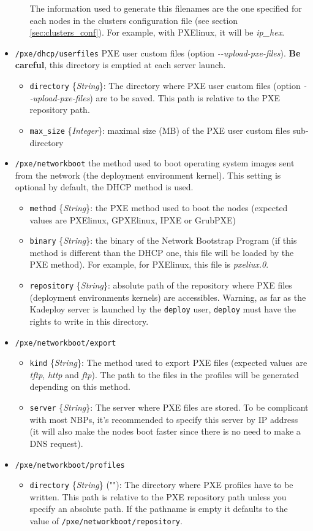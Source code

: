 \documentclass[a4wide,10pt,oneside]{book}
\newcommand{\ypath}[1]{\texttt{#1}}
\newcommand{\yfield}[2]{\texttt{#1} {\small\{{\emph{#2}}\}}:}
\newcommand{\yfieldd}[3]{\texttt{#1} {\small\{{\emph{#2}}\}} {\small(}#3{\small)}:}
\begin{document}
\begin{itemize}
\begin{itemize}
The information used to generate this filenames are the one specified for each nodes in the clusters configuration file (see section \ref{sec:clusters_conf}). For example, with PXElinux, it will be \emph{ip\_hex}.
  \end{itemize}
  \item \ypath{/pxe/dhcp/userfiles} PXE user custom files (option \emph{-{}-upload-pxe-files}). \textbf{Be careful}, this directory is emptied at each server launch.
  \begin{itemize}
    \item \yfield{directory}{String} The directory where PXE user custom files (option \emph{-{}-upload-pxe-files}) are to be saved. This path is relative to the PXE repository path.
    \item \yfield{max\_size}{Integer} maximal size (MB) of the PXE user custom files sub-directory
   \end{itemize}

  \item \ypath{/pxe/networkboot} the method used to boot operating system images sent from the network (the deployment environment kernel). This setting is optional by default, the DHCP method is used.
  \begin{itemize}
    \item \yfield{method}{String} the PXE method used to boot the nodes (expected values are PXElinux, GPXElinux, IPXE or GrubPXE)
    \item \yfield{binary}{String} the binary of the Network Bootstrap Program (if this method is different than the DHCP one, this file will be loaded by the PXE method). For example, for PXElinux, this file is \emph{pxeliux.0}.
    \item \yfield{repository}{String} absolute path of the repository where PXE files (deployment environments kernels) are accessibles. Warning, as far as the Kadeploy server is launched by the \texttt{deploy} user, \texttt{deploy} must have the rights to write in this directory.
  \end{itemize}
  \item \ypath{/pxe/networkboot/export}
  \begin{itemize}
    \item \yfield{kind}{String} The method used to export PXE files (expected values are \emph{tftp}, \emph{http} and \emph{ftp}). The path to the files in the profiles will be generated depending on this method.
    \item \yfield{server}{String} The server where PXE files are stored. To be complicant with most NBPs, it's recommended to specify this server by IP address (it will also make the nodes boot faster since there is no need to make a DNS request).
  \end{itemize}
  \item \ypath{/pxe/networkboot/profiles}
  \begin{itemize}
    \item \yfieldd{directory}{String}{""} The directory where PXE profiles have to be written. This path is relative to the PXE repository path unless you specify an absolute path. If the pathname is empty it defaults to the value of \ypath{/pxe/networkboot/repository}.


\end{itemize}
\end{itemize}
\end{document}
